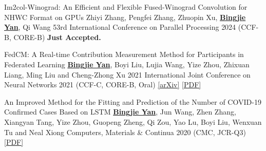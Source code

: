 \begin{cvpublications}

\cvpublication
{Im2col-Winograd: An Efficient and Flexible Fused-Winograd Convolution for NHWC Format on GPUs} %
{Zhiyi Zhang, Pengfei Zhang, Zhuopin Xu, \underline{\textbf{Bingjie Yan}}, Qi Wang\dag} %
{53rd International Conference on Parallel Processing} %
{2024} %
{(CCF-B, CORE-B)} %
{\textbf{Just Accepted.}} %








\cvpublication
{FedCM: A Real-time Contribution Measurement Method for Participants in Federated Learning} %
{\underline{\textbf{Bingjie Yan}}, Boyi Liu\dag, Lujia Wang, Yize Zhou, Zhixuan Liang, Ming Liu and Cheng-Zhong Xu} %
{2021 International Joint Conference on Neural Networks} %
{2021} %
{(CCF-C, CORE-B, \textcolor{awesome}{Oral})} %
{\href{https://arxiv.org/abs/2009.03510}{[arXiv]} \href{https://ieeexplore.ieee.org/abstract/document/9534451/}{[PDF]}} %


\cvpublication
{An Improved Method for the Fitting and Prediction of the Number of COVID-19 Confirmed Cases Based on LSTM} %
{\underline{\textbf{Bingjie Yan}}, Jun Wang, Zhen Zhang, Xiangyan Tang\dag, Yize Zhou, Guopeng Zheng, Qi Zou, Yao Lu, Boyi Liu, Wenxuan Tu and Neal Xiong} %
{Computers, Materials \& Continua} %
{2020} %
{(CMC, JCR-Q3)}
{\href{https://www.techscience.com/cmc/v64n3/39440/pdf}{[PDF]}} %

\end{cvpublications}

